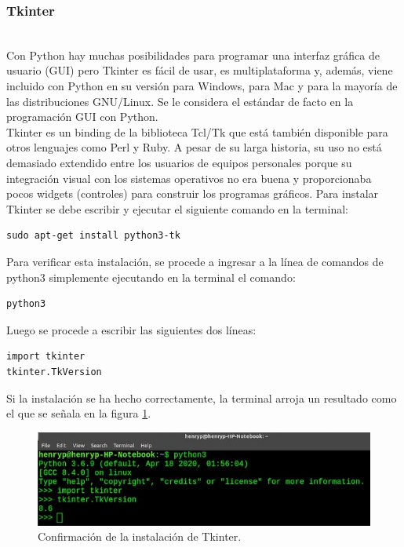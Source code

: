 {{\subsubsection{Tkinter}\\

\noindent Con Python hay muchas posibilidades para programar una interfaz gráfica de usuario (GUI) pero Tkinter es fácil de usar, es multiplataforma y, además, viene incluido con Python en su versión para Windows, para Mac y para la mayoría de las distribuciones GNU/Linux. Se le considera el estándar de facto en la programación GUI con Python.\\

\noindent Tkinter es un binding de la biblioteca Tcl/Tk que está también disponible para otros lenguajes como Perl y Ruby.
A pesar de su larga historia, su uso no está demasiado extendido entre los usuarios de equipos personales porque su integración visual con los sistemas operativos no era buena y proporcionaba pocos widgets (controles) para construir los programas gráficos.
Para instalar Tkinter se debe escribir y ejecutar el siguiente comando en la terminal:
\begin{lstlisting}
sudo apt-get install python3-tk
\end{lstlisting}
\noindent Para verificar esta instalación, se procede a ingresar a la línea de comandos de python3 simplemente ejecutando en la terminal el comando:
\begin{lstlisting}
python3 
\end{lstlisting}
\noindent Luego se procede a escribir las siguientes dos líneas:
\begin{lstlisting}
import tkinter
tkinter.TkVersion
\end{lstlisting}
\noindent Si la instalación se ha hecho correctamente, la terminal arroja un resultado como el que se señala en la figura \ref{3.1.1}.

\begin{figure}[H]
    \centering
    \includegraphics[scale=0.85]{Capitulo4/Documentos/imagenes_entorno/figura3-1-1.jpg}
    \caption{Confirmación de la instalación de Tkinter.}
    \label{3.1.1}
\end{figure}
}}

